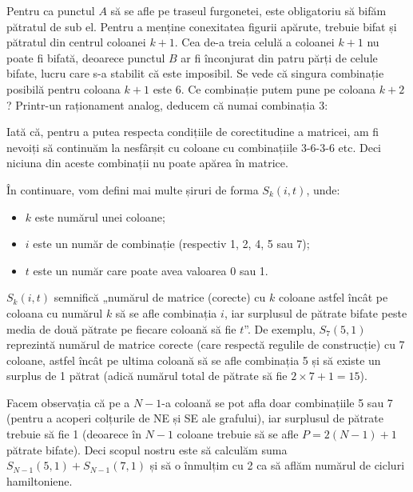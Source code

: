 Pentru ca punctul $A$ să se afle pe traseul furgonetei, este obligatoriu să
bifăm pătratul de sub el. Pentru a menține conexitatea figurii apărute,
trebuie bifat și pătratul din centrul coloanei $k+1$. Cea de-a treia celulă a
coloanei $k+1$ nu poate fi bifată, deoarece punctul $B$ ar fi înconjurat din
patru părți de celule bifate, lucru care s-a stabilit că este imposibil. Se
vede că singura combinație posibilă pentru coloana $k+1$ este 6. Ce combinație
putem pune pe coloana $k+2$? Printr-un raționament analog, deducem că numai
combinația 3:


Iată că, pentru a putea respecta condițiile de corectitudine a matricei, am fi
nevoiți să continuăm la nesfârșit cu coloane cu combinațiile 3-6-3-6 etc. Deci
niciuna din aceste combinații nu poate apărea în matrice.

În continuare, vom defini mai multe șiruri de forma $S_k(i,t)$, unde:

\begin{itemize}

\item $k$ este numărul unei coloane;

\item $i$ este un număr de combinație (respectiv 1, 2, 4, 5 sau 7);

\item $t$ este un număr care poate avea valoarea 0 sau 1.

\end{itemize}

$S_k(i,t)$ semnifică „numărul de matrice (corecte) cu $k$ coloane astfel încât
pe coloana cu numărul $k$ să se afle combinația $i$, iar surplusul de pătrate
bifate peste media de două pătrate pe fiecare coloană să fie $t$”. De exemplu,
$S_7(5,1)$ reprezintă numărul de matrice corecte (care respectă regulile de
construcție) cu 7 coloane, astfel încât pe ultima coloană să se afle
combinația 5 și să existe un surplus de 1 pătrat (adică numărul total de
pătrate să fie $2 \times 7 + 1 = 15$).

Facem observația că pe a $N-1$-a coloană se pot afla doar combinațiile 5 sau 7
(pentru a acoperi colțurile de NE și SE ale grafului), iar surplusul de
pătrate trebuie să fie 1 (deoarece în $N-1$ coloane trebuie să se afle
$P=2(N-1)+1$ pătrate bifate). Deci scopul nostru este să calculăm suma
$S_{N-1}(5,1) + S_{N-1}(7,1)$ și să o înmulțim cu 2 ca să aflăm numărul de
cicluri hamiltoniene.

